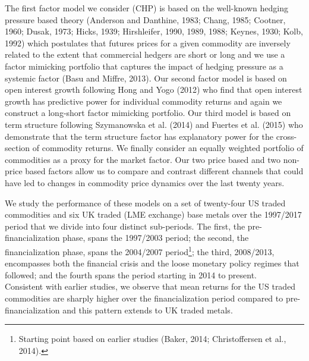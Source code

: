 \documentclass[]{elsarticle} %
\begin{document}
The first factor model we consider (CHP) is based on the well-known
hedging pressure based theory (Anderson and Danthine, 1983; Chang, 1985;
Cootner, 1960; Dusak, 1973; Hicks, 1939; Hirshleifer, 1990, 1989, 1988;
Keynes, 1930; Kolb, 1992) which postulates that futures prices for a
given commodity are inversely related to the extent that commercial
hedgers are short or long and we use a factor mimicking portfolio that
captures the impact of hedging pressure as a systemic factor (Basu and
Miffre, 2013). Our second factor model is based on open interest growth
following Hong and Yogo (2012) who find that open interest growth has
predictive power for individual commodity returns and again we construct
a long-short factor mimicking portfolio. Our third model is based on
term structure following Szymanowska et al. (2014) and Fuertes et al.
(2015) who demonstrate that the term structure factor has explanatory
power for the cross-section of commodity returns. We finally consider an
equally weighted portfolio of commodities as a proxy for the market
factor. Our two price based and two non-price based factors allow us to
compare and contrast different channels that could have led to changes
in commodity price dynamics over the last twenty years.

We study the performance of these models on a set of twenty-four US
traded commodities and six UK traded (LME exchange) base metals over the
1997/2017 period that we divide into four distinct sub-periods. The
first, the pre-financialization phase, spans the 1997/2003 period; the
second, the financialization phase, spans the 2004/2007 period\footnote{Starting
  point based on earlier studies (Baker, 2014; Christoffersen et al.,
  2014).}; the third, 2008/2013, encompasses both the financial crisis
and the loose monetary policy regimes that followed; and the fourth
spans the period starting in 2014 to present.\\
Consistent with earlier studies, we observe that mean returns for the US
traded commodities are sharply higher over the financialization period
compared to pre-financialization and this pattern extends to UK traded
metals.
\end{document}
